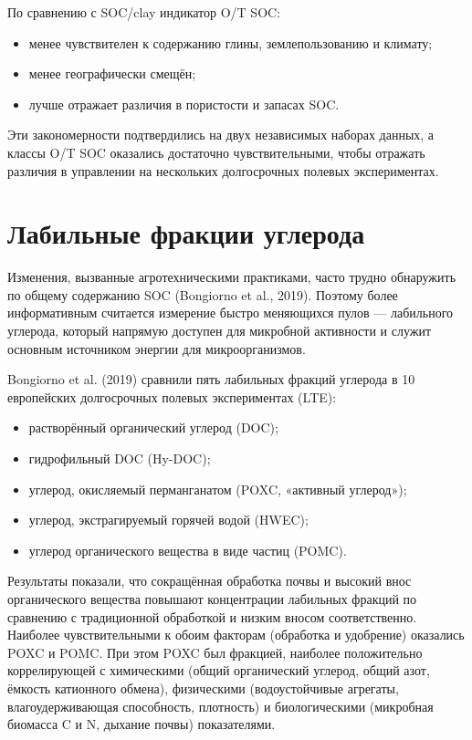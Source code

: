 \documentclass[11pt,a4paper]{article}
\begin{document}
По сравнению с SOC/clay индикатор O/T SOC:
\begin{itemize}
  \item менее чувствителен к содержанию глины, землепользованию и климату;
  \item менее географически смещён;
  \item лучше отражает различия в пористости и запасах SOC.
\end{itemize}

Эти закономерности подтвердились на двух независимых наборах данных, а классы
O/T SOC оказались достаточно чувствительными, чтобы отражать различия в
управлении на нескольких долгосрочных полевых экспериментах.

\section{Лабильные фракции углерода}
\label{sec:labile}

Изменения, вызванные агротехническими практиками, часто трудно обнаружить по
общему содержанию SOC (Bongiorno et al., 2019). Поэтому более информативным считается
измерение быстро меняющихся пулов --- лабильного углерода, который напрямую
доступен для микробной активности и служит основным источником энергии для
микроорганизмов.

Bongiorno et al. (2019) сравнили пять лабильных фракций углерода в 10
европейских долгосрочных полевых экспериментах (LTE):
\begin{itemize}
  \item растворённый органический углерод (DOC);
  \item гидрофильный DOC (Hy-DOC);
  \item углерод, окисляемый перманганатом (POXC, «активный углерод»);
  \item углерод, экстрагируемый горячей водой (HWEC);
  \item углерод органического вещества в виде частиц (POMC).
\end{itemize}

Результаты показали, что сокращённая обработка почвы и высокий внос
органического вещества повышают концентрации лабильных фракций по сравнению
с традиционной обработкой и низким вносом соответственно. Наиболее
чувствительными к обоим факторам (обработка и удобрение) оказались POXC и
POMC. При этом POXC был фракцией, наиболее положительно коррелирующей с
химическими (общий органический углерод, общий азот, ёмкость катионного
обмена), физическими (водоустойчивые агрегаты, влагоудерживающая способность,
плотность) и биологическими (микробная биомасса C и N, дыхание почвы)
показателями.
\end{document}
